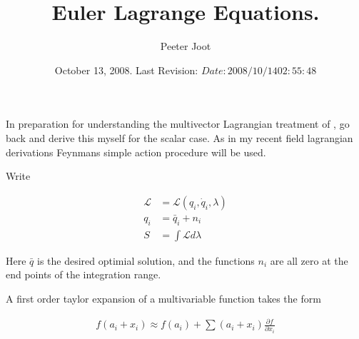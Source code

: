 \documentclass{article}
\title{Euler Lagrange Equations.}
\author{Peeter Joot}
\date{ October 13, 2008.  Last Revision: $Date: 2008/10/14 02:55:48 $ }
\newcommand{\LL}[0]{\mathcal{L}}
\newcommand{\qdot}[0]{\dot{q}}
\newcommand{\qbar}[0]{\bar{q}}
\newcommand{\PD}[2]{\frac{\partial {#2}}{\partial {#1}}}
\begin{document}
\maketitle{}


In preparation for understanding the multivector Lagrangian treatment of
\cite{lasenby1993mda}, go back and derive this myself for the scalar
case.  As in my recent field lagrangian derivations Feynmans
\cite{feynman1963flp} simple action procedure will be used.

Write 

\begin{align*}
\LL &= \LL(q_i, \qdot_i, \lambda) \\
q_i &= \qbar_i + n_i \\
S &= \int \LL d\lambda
\end{align*}

Here $\qbar$ is the desired optimial solution, and the functions $n_i$
are all zero at the end points of the integration range.

A first order taylor expansion of a multivariable function takes the form

\begin{align*}
f(a_i + x_i) \approx f(a_i) + \sum (a_i + x_i) \PD{x_i}{f} 
\end{align*}


\end{document}
